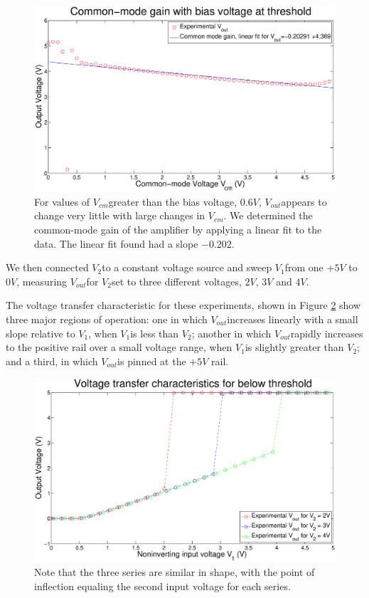 \documentclass{article}
\newcommand{\Vout}{{$V_{out}$}}
\newcommand{\Vcm}{{$V_{cm}$}}
\newcommand{\Vtwo}{{$V_{2}$}}
\newcommand{\Vone}{{$V_{1}$}}
\begin{document}
\begin{figure}[H]
\centering
\includegraphics[width=\linewidth]{../Figures/Exp1P1.eps}
\caption{For values of \Vcm greater than the bias voltage, $0.6V$, \Vout appears to change very little with large changes in \Vcm.  We determined the common-mode gain of the amplifier by applying a linear fit to the data. The linear fit found had a slope $-0.202$.}
\label{fig:exp1p1}
\end{figure}

We then connected \Vtwo to a constant voltage source and sweep \Vone from one $+5V$ to $0V$, measuring \Vout for \Vtwo set to three different voltages, $2V$, $3V$ and $4V$.

The voltage transfer characteristic for these experiments, shown in Figure \ref{fig:exp1p2} show three major regions of operation: one in which \Vout increases linearly with a small slope relative to \Vone, when \Vone is less than \Vtwo; another in which \Vout rapidly increases to the positive rail over a small voltage range, when \Vone is slightly greater than \Vtwo; and a third, in which \Vout is pinned at the $+5V$ rail.


\begin{figure}[H]
\centering
\includegraphics[width=\linewidth]{../Figures/Exp1P2.eps}
\caption{Note that the three series are similar in shape, with the point of inflection equaling the second input voltage for each series.}
\label{fig:exp1p2}
\end{figure}
\end{document}

